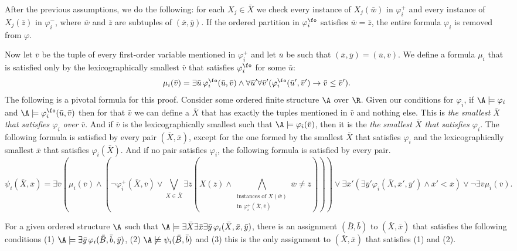 After the previous assumptions, we do the following: for each $X_j\in \bar{X}$ we check every instance of $X_j(\bar{w})$ in $\varphi^{+}_i$ and every instance of $X_j(\bar{z})$ in $\varphi^{-}_i$, where $\bar{w}$ and $\bar{z}$ are subtuples of $(\bar{x},\bar{y})$. If the ordered partition in $\varphi^{\fo}_i$ satisfies $\bar{w} = \bar{z}$, the entire formula $\varphi_i$ is removed from $\varphi$.

Now let $\bar{v}$ be the tuple of every first-order variable mentioned in $\varphi_i^{+}$ and let $\bar{u}$ be such that $(\bar{x},\bar{y}) = (\bar{u},\bar{v})$. We define a formula $\mu_i$ that is satisfied only by the lexicographically smallest $\bar{v}$ that satisfies $\varphi_i^{\fo}$ for some $\bar{u}$:
$$
\mu_i(\bar{v}) = \exists\bar{u}\,\varphi_i^{\fo}(\bar{u},\bar{v})\wedge\forall\bar{u}'\forall\bar{v}'(\varphi_i^{\fo}(\bar{u}',\bar{v}')\to\bar{v}\leq\bar{v}').
$$
The following is a pivotal formula for this proof. Consider some ordered finite structure $\A$ over $\R$. Given our conditions for $\varphi_i$, if $\A\models\varphi_i$ and $\A\models\varphi^{\fo}_i(\bar{u},\bar{v})$ then for that $\bar{v}$ we can define a $\bar{X}$ that has exactly the tuples mentioned in $\bar{v}$ and nothing else. This is {\em the smallest $\bar{X}$ that satisfies $\varphi_i$ over $\bar{v}$}. And if $\bar{v}$ is the lexicographically smallest such that $\A\models\varphi_i(\bar{v})$, then it is the {\em the smallest $\bar{X}$ that satisfies $\varphi_i$}. The following formula is satisfied by every pair $(\bar{X},\bar{x})$, except for the one formed by the smallest $\bar{X}$ that satisfies $\varphi_i$ and the lexicographically smallest $\bar{x}$ that satisfies $\varphi_i(\bar{X})$. And if no pair satisfies $\varphi_i$, the following formula is satisfied by every pair.
$$
\psi_i(\bar{X},\bar{x}) = \exists\bar{v}(\mu_i(\bar{v})\wedge(\neg\varphi^{+}_i(\bar{X},\bar{v})\vee\bigvee_{X \in \bar{X}} \exists\bar{z}(X(\bar{z}) \wedge \bigwedge\limits_{\substack{\text{instances of }X(\bar{w}) \\ \text{in }\varphi^{+}_i(\bar{X},\bar{v})}}\bar{w}\neq\bar{z}))) \vee \exists\bar{x}'(\exists\bar{y}'\varphi_i(\bar{X},\bar{x}',\bar{y}')\wedge \bar{x}'<\bar{x})\vee\neg\exists\bar{v}\mu_i(\bar{v}) .
$$
\begin{claim}
For a given ordered structure $\A$ such that $\A\models\exists\bar{X}\exists\bar{x}\exists\bar{y}\,\varphi_i(\bar{X},\bar{x},\bar{y})$, there is an assignment $(\bar{B},\bar{b})$ to $(\bar{X},\bar{x})$ that satisfies the following conditions (1) $\A\models\exists\bar{y}\,\varphi_i(\bar{B},\bar{b},\bar{y})$, (2) $\A\not\models\psi_i(\bar{B},\bar{b})$ and (3) this is the only assignment to $(\bar{X},\bar{x})$ that satisfies (1) and (2).
\end{claim}
